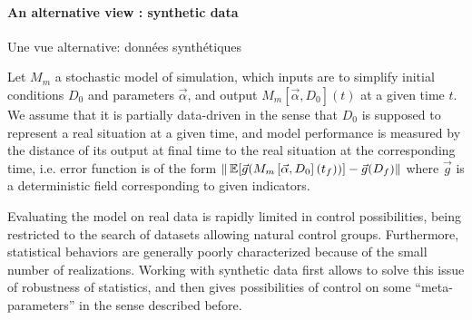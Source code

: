 
\paragraph{An alternative view : synthetic data}{Une vue alternative: données synthétiques}

Let $M_{m}$ a stochastic model of simulation, which inputs are to simplify initial conditions $D_0$ and parameters $\vec{\alpha}$, and output $M_{m}\left[\vec{\alpha},D_0\right](t)$ at a given time $t$. We assume that it is partially data-driven in the sense that $D_0$ is supposed to represent a real situation at a given time, and model performance is measured by the distance of its output at final time to the real situation at the corresponding time, i.e. error function is of the form $\| \operatorname{\mathbb{E}}\!\left[\vec{g}(M_{m}\left[\vec{\alpha},D_0\right](t_f))\right]-\vec{g}(D_f) \|$ where $\vec{g}$ is a deterministic field corresponding to given indicators.


Evaluating the model on real data is rapidly limited in control possibilities, being restricted to the search of datasets allowing natural control groups. Furthermore, statistical behaviors are generally poorly characterized because of the small number of realizations. Working with synthetic data first allows to solve this issue of robustness of statistics, and then gives possibilities of control on some ``meta-parameters'' in the sense described before.


















